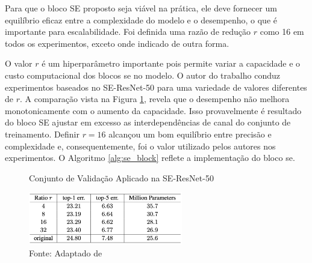 Para que o bloco SE proposto seja viável na prática, ele deve fornecer um equilíbrio eficaz entre a complexidade do modelo e o desempenho, o que é importante para escalabilidade. Foi definida uma razão de redução $r$ como 16 em todos os experimentos, exceto onde indicado de outra forma. 

O valor $r$ é um hiperparâmetro importante pois permite variar a capacidade e o custo computacional dos blocos \gls{se} no modelo. O autor do trabalho conduz experimentos baseados no SE-ResNet-50 para uma variedade de valores diferentes de $r$. A comparação vista na Figura  \ref{fig:fig027}, revela que o desempenho não melhora monotonicamente com o aumento da capacidade. Isso provavelmente é resultado do bloco SE ajustar em excesso as interdependências de canal do conjunto de treinamento. Definir $r = 16$ alcançou um bom equilíbrio entre precisão e complexidade e, consequentemente, foi o valor utilizado pelos autores nos experimentos. O Algoritmo \ref{alg:se_block} reflete a implementação do bloco \gls{se}.

\begin{figure}[h!]
    \centering
    \caption{Conjunto de Validação Aplicado na SE-ResNet-50}
    \includegraphics[width=0.6\textwidth]{figures/fig027.png}
    \caption*{Fonte: Adaptado de \cite{huSqueezeandExcitationNetworks2018}}
    \label{fig:fig027}
\end{figure}

